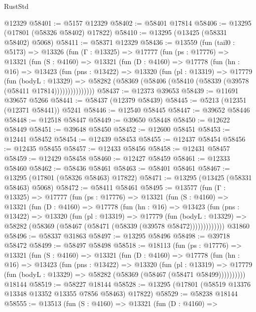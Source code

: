 \begin{lexlean}{RustStd}
\begin{coremodule}
    @12329
@58401 := @5157 @12329
@58402 := @58401 @17814
@58406 := @13295 (@17801 (@58326 @58402) @17822)
@58410 := @13295 (@13425 (@58331 @58402) @5068)
@58411 := @58371 @12329
@58436 := @13559
    (fun (tail0 : @5173) =>
    @13326
      (fun (Γ : @13325) =>
      @17777
        (fun (ps : @17776) =>
        @13321
          (fun (S : @4160) =>
          @13321
            (fun (D : @4160) =>
            @17778
              (fun (hn : @16) =>
              @13423
                (fun (pns : @13422) =>
                @13320
                  (fun (pl : @13319) =>
                  @17779
                    (fun (bodyL : @13329) =>
                    @58282 (@58369 (@58406 (@58410 (@58339 (@39578 (@58411 @17814)))))))))))))))
@58437 := @12373 @39653
@58439 := @11691 @39657 @5266
@58441 := @58437 (@12379 @58439)
@58445 := @5213 (@12351 (@12371 @58441)) @5241
@58446 := @12540 @58445
@58447 := @39652 @58446
@58448 := @12518 @58447
@58449 := @39650 @58448
@58450 := @12622 @58449
@58451 := @39648 @58450
@58452 := @12600 @58451
@58453 := @12441 @58452
@58454 := @12439 @58453
@58455 := @12437 @58454
@58456 := @12435 @58455
@58457 := @12433 @58456
@58458 := @12431 @58457
@58459 := @12429 @58458
@58460 := @12427 @58459
@58461 := @12333 @58460
@58462 := @58436 @58461
@58463 := @58401 @58461
@58467 := @13295 (@17801 (@58326 @58463) @17822)
@58471 := @13295 (@13425 (@58331 @58463) @5068)
@58472 := @58411 @58461
@58495 := @13577
    (fun (Γ : @13325) =>
    @17777
      (fun (ps : @17776) =>
      @13321
        (fun (S : @4160) =>
        @13321
          (fun (D : @4160) =>
          @17778
            (fun (hn : @16) =>
            @13423
              (fun (pns : @13422) =>
              @13320
                (fun (pl : @13319) =>
                @17779
                  (fun (bodyL : @13329) =>
                  @58282 (@58369 (@58467 (@58471 (@58339 (@39578 @58472)))))))))))))
    @31860
@58496 := @58337 @31863
@58497 := @13295 @58496
@58498 := @39718 @58472
@58499 := @58497 @58498
@58518 := @18113
    (fun (ps : @17776) =>
    @13321
      (fun (S : @4160) =>
      @13321
        (fun (D : @4160) =>
        @17778
          (fun (hn : @16) =>
          @13423
            (fun (pns : @13422) =>
            @13320
              (fun (pl : @13319) =>
              @17779 (fun (bodyL : @13329) => @58282 (@58369 (@58467 (@58471 @58499))))))))))
    @18144
@58519 := @58227 @18144
@58528 := @13295 (@17801 (@58519 @13376 @13348 @13352 @13355 @7856 @58463) @17822)
@58529 := @58238 @18144
@58555 := @13513
    (fun (S : @4160) =>
    @13321
      (fun (D : @4160) =>

\end{coremodule}
\end{lexlean}
